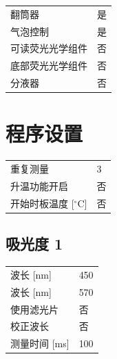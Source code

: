\documentclass[UTF8,10pt,a4paper,fontset=fandol]{ctexart}
\newcommand{\fieldvalue}[1]{#1}
\begin{document}
\begin{tabular}{@{}ll@{}}
翻筒器 &
\fieldvalue{是}\\
气泡控制 &
\fieldvalue{是}\\
可读荧光光学组件 &
\fieldvalue{否}\\
底部荧光光学组件 &
\fieldvalue{否}\\
分液器 &
\fieldvalue{否}
\end{tabular}

\section{程序设置}

\begin{tabular}{@{}ll@{}}
重复测量 &
\fieldvalue{3}\\
升温功能开启 &
\fieldvalue{否}\\
开始时板温度 [$^\circ$C] &
\fieldvalue{否}
\end{tabular}

\subsection{吸光度 1}

\begin{tabular}{@{}ll@{}}
波长 [nm] &
\fieldvalue{450}\\
波长 [nm] &
\fieldvalue{570}\\
使用滤光片 &
\fieldvalue{否}\\
校正波长 &
\fieldvalue{否}\\
测量时间 [ms] &
\fieldvalue{100}
\end{tabular}

\end{document}
